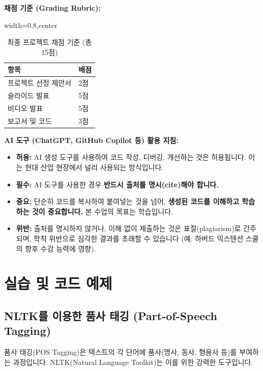 \documentclass[11pt,a4paper]{article}
\theoremstyle{definition}
\begin{document}
\textbf{채점 기준 (Grading Rubric):}
\begin{table}[h!]
\caption{최종 프로젝트 채점 기준 (총 15점)}
\label{tab:project_rubric}
\centering
\begin{adjustbox}{width=0.8\textwidth,center}
\begin{tabular}{ll}
\toprule
\textbf{항목} & \textbf{배점} \\
\midrule
프로젝트 선정 제안서 & 2점 \\
슬라이드 발표 & 5점 \\
비디오 발표 & 5점 \\
보고서 및 코드 & 3점 \\
\bottomrule
\end{tabular}
\end{adjustbox}
\end{table}

\textbf{AI 도구 (ChatGPT, GitHub Copilot 등) 활용 지침:}
\begin{itemize}
    \item \textbf{허용:} AI 생성 도구를 사용하여 코드 작성, 디버깅, 개선하는 것은 허용됩니다. 이는 현대 산업 현장에서 널리 사용되는 방식입니다.
    \item \textbf{필수:} AI 도구를 사용한 경우 \textbf{반드시 출처를 명시(cite)해야 합니다.}
    \item \textbf{중요:} 단순히 코드를 복사하여 붙여넣는 것을 넘어, \textbf{생성된 코드를 이해하고 학습하는 것이 중요합니다.} 본 수업의 목표는 학습입니다.
    \item \textbf{위반:} 출처를 명시하지 않거나, 이해 없이 제출하는 것은 표절(plagiarism)로 간주되며, 학칙 위반으로 심각한 결과를 초래할 수 있습니다 (예: 하버드 익스텐션 스쿨의 향후 수강 능력에 영향).
\end{itemize}

\newpage
\section{실습 및 코드 예제}

\subsection{NLTK를 이용한 품사 태깅 (Part-of-Speech Tagging)}
품사 태깅(POS Tagging)은 텍스트의 각 단어에 품사(명사, 동사, 형용사 등)를 부여하는 과정입니다. NLTK(Natural Language Toolkit)는 이를 위한 강력한 도구입니다.
\end{document}
